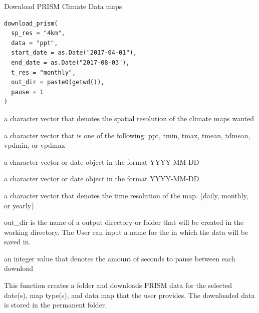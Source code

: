 %
\begin{Description}
Download PRISM Climate Data maps
\end{Description}
%
\begin{Usage}
\begin{verbatim}
download_prism(
  sp_res = "4km",
  data = "ppt",
  start_date = as.Date("2017-04-01"),
  end_date = as.Date("2017-08-03"),
  t_res = "monthly",
  out_dir = paste0(getwd()),
  pause = 1
)
\end{verbatim}
\end{Usage}
%
\begin{Arguments}
\begin{ldescription}
\item[\code{sp\_res}] a character vector that denotes the spatial resolution of the
climate maps wanted

\item[\code{data}] a character vector that is one of the following:
ppt, tmin, tmax, tmean, tdmean, vpdmin, or vpdmax

\item[\code{start\_date}] a character vector or date object in the format YYYY-MM-DD

\item[\code{end\_date}] a character vector or date object in the format YYYY-MM-DD

\item[\code{t\_res}] a character vector that denotes the time resolution
of the map. (daily, monthly, or yearly)

\item[\code{out\_dir}] out\_dir is the name of a output directory or folder that will
be created in the working directory. The User can input a name for the
in which the data will be saved in.

\item[\code{pause}] an integer value that denotes the amount of seconds to pause
between each download
\end{ldescription}
\end{Arguments}
%
\begin{Details}
This function creates a folder and downloads PRISM data
for the selected date(s), map type(s), and data map that the user provides.
The downloaded data is stored in the permanent folder.
\end{Details}
